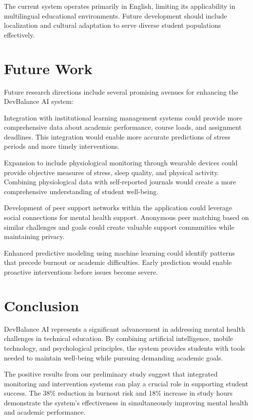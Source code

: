 \documentclass[conference,10pt]{IEEEtran}
\begin{document}
The current system operates primarily in English, limiting its applicability in multilingual educational environments. Future development should include localization and cultural adaptation to serve diverse student populations effectively.

\section{Future Work}

Future research directions include several promising avenues for enhancing the DevBalance AI system:

Integration with institutional learning management systems could provide more comprehensive data about academic performance, course loads, and assignment deadlines. This integration would enable more accurate predictions of stress periods and more timely interventions.

Expansion to include physiological monitoring through wearable devices could provide objective measures of stress, sleep quality, and physical activity. Combining physiological data with self-reported journals would create a more comprehensive understanding of student well-being.

Development of peer support networks within the application could leverage social connections for mental health support. Anonymous peer matching based on similar challenges and goals could create valuable support communities while maintaining privacy.

Enhanced predictive modeling using machine learning could identify patterns that precede burnout or academic difficulties. Early prediction would enable proactive interventions before issues become severe.

\section{Conclusion}

DevBalance AI represents a significant advancement in addressing mental health challenges in technical education. By combining artificial intelligence, mobile technology, and psychological principles, the system provides students with tools needed to maintain well-being while pursuing demanding academic goals.

The positive results from our preliminary study suggest that integrated monitoring and intervention systems can play a crucial role in supporting student success. The 38\% reduction in burnout risk and 18\% increase in study hours demonstrate the system's effectiveness in simultaneously improving mental health and academic performance.
\end{document}
